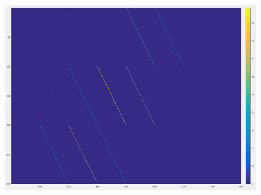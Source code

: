 \documentclass{beamer}
\begin{document}
\begin{frame}
\begin{columns}
\vspace{-20pt}

\begin{figure}
\includegraphics[scale=0.4]{FiguresUpd/HRGB.png}
\end{figure}
\end{columns}

\end{frame}



%

\end{document}
